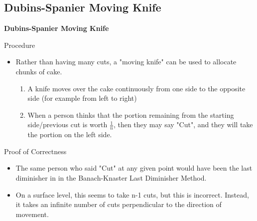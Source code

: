 \documentclass[aspectratio=169,xcolor=dvipsnames]{beamer}
\begin{document}
\subsection{Dubins-Spanier Moving Knife}
\begin{frame}
	\Huge{\centerline{\textbf{Dubins-Spanier Moving Knife}}}
\end{frame}
\begin{frame}{Procedure}
	\begin{itemize}
		\item Rather than having many cuts, a "moving knife" can be used to allocate chunks of cake.
		\begin{enumerate}
			\item A knife moves over the cake continuously from one side to the opposite side (for example from left to right)
			\item When a person thinks that the portion remaining from the starting side/previous cut is worth $\frac{1}{n}$, then they may say "Cut", and they will take the portion on the left side.
		\end{enumerate}
	\end{itemize}
\end{frame}
\begin{frame}{Proof of Correctness}
	\begin{itemize}
		\item The same person who said "Cut" at any given point would have been the last diminisher in in the Banach-Knaster Last Diminisher Method.\pause
		\item On a surface level, this seems to take n-1 cuts, but this is incorrect. Instead, it takes an infinite number of cuts perpendicular to the direction of movement.
	\end{itemize}
\end{frame}
\end{document}
